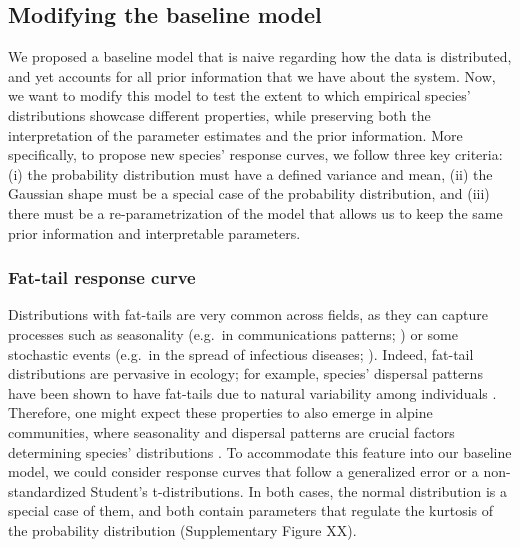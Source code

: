 \documentclass[11pt, a4paper]{article}
\begin{document}
\subsection*{Modifying the baseline model}
We proposed a baseline model that is naive regarding how the data is distributed, and yet accounts for all prior information that we have about the system. Now, we want to modify this model to test the extent to which empirical species' distributions showcase different properties, while preserving both the interpretation of the parameter estimates and the prior information. More specifically, to propose new species' response curves, we follow three key criteria: (i) the probability distribution must have a defined variance and mean, (ii) the Gaussian shape must be a special case of the probability distribution, and (iii) there must be a re-parametrization of the model that allows us to keep the same prior information and interpretable parameters.

\subsubsection*{Fat-tail response curve}
Distributions with fat-tails are very common across fields, as they can capture processes such as seasonality (e.g.~in communications patterns; \citealt{malmgrenPoissonianExplanationHeavy2008}) or some stochastic events (e.g.~in the spread of infectious diseases; \citealt{wongEvidenceThatCoronavirus2020}). Indeed, fat-tail distributions are pervasive in ecology; for example, species' dispersal patterns have been shown to have fat-tails due to natural variability among individuals \citep{petrovskiiDispersalStatisticallyStructured2009}. Therefore, one might expect these properties to also emerge in alpine communities, where seasonality and dispersal patterns are crucial factors determining species' distributions \citep{ref}. To accommodate this feature into our baseline model, we could consider response curves that follow a generalized error or a non-standardized Student's t-distributions. In both cases, the normal distribution is a special case of them, and both contain parameters that regulate the kurtosis of the probability distribution (Supplementary Figure XX).
\end{document}
